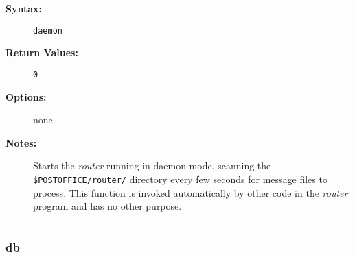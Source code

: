 \begin{description}
\item[{\bf Syntax:}] \mbox{}

{\tt daemon}

\item[{\bf Return Values:}] \mbox{}

\begin{description}
\item[{\tt 0}] \mbox{}



\end{description}


\item[{\bf Options:}] \mbox{}

none  

\item[{\bf Notes:}] \mbox{}

Starts the {\em router} running in daemon mode, 
scanning the {\tt \$POSTOFFICE/router/} directory every few 
seconds for message files to process. This function is invoked 
automatically by other code in the {\em router} program and has no 
other purpose.

\end{description}


\hrule
\subsubsection{db}

